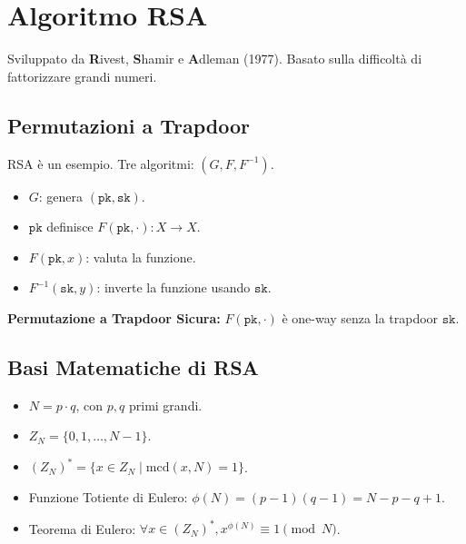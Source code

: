 \section{Algoritmo RSA}
Sviluppato da \textbf{R}ivest, \textbf{S}hamir e \textbf{A}dleman (1977). Basato sulla difficoltà di fattorizzare grandi numeri.

\subsection{Permutazioni a Trapdoor}
RSA è un esempio. Tre algoritmi: $(G, F, F^{-1})$.
\begin{itemize}
    \item $G$: genera $(\texttt{pk}, \texttt{sk})$.
    \item $\texttt{pk}$ definisce $F(\texttt{pk}, \cdot): X \to X$.
    \item $F(\texttt{pk}, x)$: valuta la funzione.
    \item $F^{-1}(\texttt{sk}, y)$: inverte la funzione usando $\texttt{sk}$.
\end{itemize}
\textbf{Permutazione a Trapdoor Sicura:} $F(\texttt{pk}, \cdot)$ è one-way senza la trapdoor $\texttt{sk}$.

\subsection{Basi Matematiche di RSA}
\begin{itemize}
    \item $N = p \cdot q$, con $p, q$ primi grandi.
    \item $Z_N = \{0, 1, \dots, N-1\}$.
    \item $(Z_N)^* = \{x \in Z_N \mid \text{mcd}(x, N) = 1\}$.
    \item Funzione Totiente di Eulero: $\phi(N) = (p-1)(q-1) = N - p - q + 1$.
    \item Teorema di Eulero: $\forall x \in (Z_N)^*, x^{\phi(N)} \equiv 1 \pmod N$.
\end{itemize}

